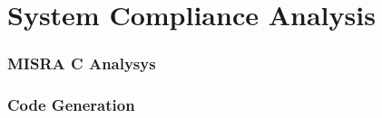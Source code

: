 
\chapter{System Compliance Analysis}

\subsection{MISRA C Analysys}

\subsection{Code Generation}
	
